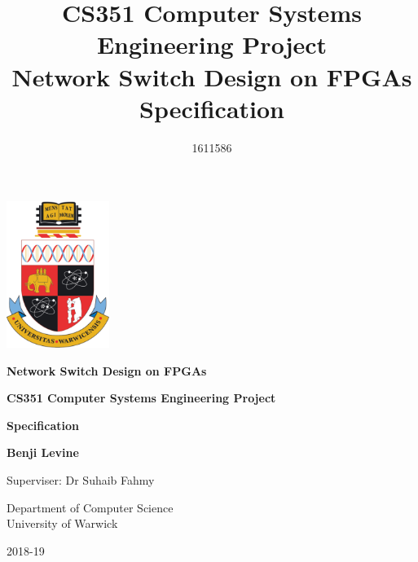 \begin{titlepage}
   \begin{center}
       \vspace*{1.5cm}

      \includegraphics[width=0.25\textwidth]{warwick_logo_old.png}

      \vspace{1.5cm}
      \textbf{Network Switch Design on FPGAs}

      \vspace{1.5cm}
      \textbf{CS351 Computer Systems Engineering Project} \\
      \vspace{0.5cm}


      \textbf{Specification}

      \vspace{4cm}

      \textbf{Benji Levine}

      \vspace{4cm}

      Superviser: Dr Suhaib Fahmy

      \vspace{0.8cm}

      Department of Computer Science\\
      University of Warwick

      \vspace{0.7cm}

      2018-19

   \end{center}
\end{titlepage}


\title{CS351 Computer Systems Engineering Project \\ \vspace{0.5cm} Network Switch Design on FPGAs \\ \vspace{0.3cm} \Large{Specification}}
\author{1611586}
